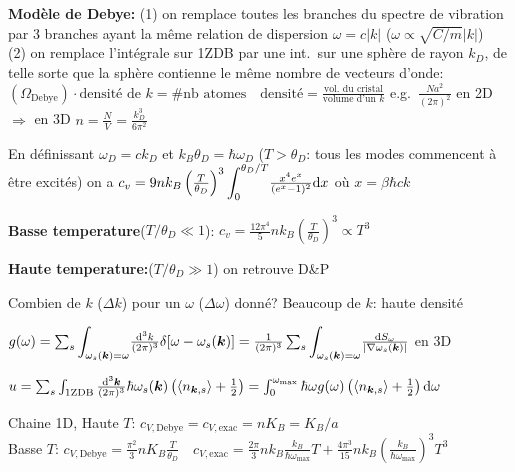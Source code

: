 \begin{squishlist}
    \item \textbf{Modèle de Debye:} (1) on remplace toutes les branches du spectre de vibration par 3 branches ayant la même relation de dispersion $\omega = c|k|$ ($\omega \propto \sqrt{C/m}|k|$) \\
    (2) on remplace l'intégrale sur 1ZDB par une int.\ sur une sphère de rayon $k_D$, de telle sorte que la sphère contienne le même nombre de vecteurs d'onde: \\
    $\left( \Omega_{\text{Debye}} \right) \cdot \text{densité de }k = \# \text{nb atomes}\quad \text{densité}=\frac{\text{vol.\ du cristal}}{\text{volume d'un }k}$ e.g.\ $\frac{N a^2}{(2\pi)^2}$ en 2D \\
    $\Longrightarrow$ en 3D $n = \frac{N}{V} = \frac{k_D^3}{6\pi^2}$
    \item En définissant $\omega_D = ck_D$ et $k_B \theta_D = \hbar \omega_D$ ($T > \theta_D$: tous les modes commencent à être excités) on a
    $c_v = 9 n k_B \left(\frac{T}{\theta_D}\right)^3 {\displaystyle \int_0^{\theta_D/T}} \frac{x^4 e^x}{(e^x - 1)^2} \textrm{d} x$ où $x = \beta \hbar c k$
    \item \textbf{Basse temperature}($T/\theta_D \ll 1$): $c_v = \frac{12\pi^4}{5} n k_B \left( \frac{T}{\theta_D}\right)^3 \propto T^3$
    \item \textbf{Haute temperature:}($T/\theta_D \gg 1$) on retrouve D\&P
\end{squishlist}

Combien de $k$ ($\Delta k$) pour un $\omega$ ($\Delta \omega$) donné? Beaucoup de $k$: haute densité
\begin{squishlist}
    \item $g(\omega) = \sum_s {\displaystyle \int_{\omega_s(\bm{k}) = \omega}} \frac{\textrm{d}^3 k}{(2\pi)^3}\delta[\omega - \omega_s(\bm{k})] = \frac{1}{(2\pi)^3} \sum_s {\displaystyle \int_{\omega_s(\bm{k}) = \omega}} \frac{\textrm{d} S_{\omega}}{|\nabla \omega_s(\bm{k})|}$ en 3D
    \item $u = \sum_s \int_{\text{1ZDB}} \frac{\textrm{d}^3 \bm{k}}{(2\pi)^3} \hbar \omega_s(\bm{k}) \left(\braket{n_{\bm{k}, s}} + \frac{1}{2}\right) = \int_{0}^{\omega_{\text{max}}} \hbar \omega g(\omega) \left(\braket{n_{\bm{k}, s}} + \frac{1}{2}\right)  \textrm{d} \omega$
    \item Chaine 1D, Haute $T$: $c_{V, \text{Debye}} = c_{V,\text{exac}} = n K_B = K_B / a$ \\
    Basse $T$: $c_{V, \text{Debye}} = \frac{\pi^2}{3}nK_B \frac{T}{\theta_D} \quad c_{V,\text{exac}} = \frac{2\pi}{3} n k_B \frac{k_B}{\hbar \omega_{\max}} T + \frac{4 \pi^3}{15} nk_B \left(\frac{k_B}{\hbar \omega_{\max}}\right)^3 T^3$
\end{squishlist}

